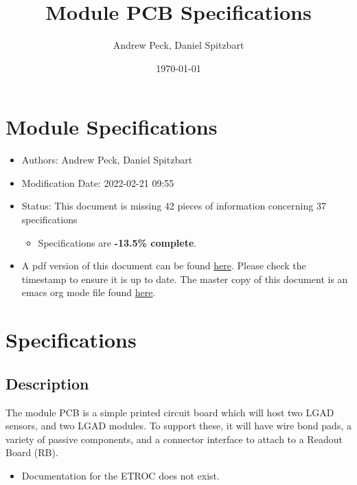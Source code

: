 \documentclass[11pt]{article}
\author{Andrew Peck, Daniel Spitzbart}
\date{\today}
\title{Module PCB Specifications}
\begin{document}
\maketitle
\section{Module Specifications}
\label{sec:org608ffa0}

\begin{itemize}
\item Authors: Andrew Peck, Daniel Spitzbart

\item Modification Date: 2022-02-21 09:55

\item Status: This document is missing 42 pieces of information concerning  37 specifications
\begin{itemize}
\item Specifications are \textbf{-13.5\% complete}.
\end{itemize}

\item A pdf version of this document can be found \href{./module-specs.pdf}{here}. Please check the timestamp to ensure it is up to date. The master copy of this document is an emacs org mode file found \href{https://gitlab.cern.ch/cms-etl-electronics/readout-board-docs/-/blob/master/docs/Specifications/module-specs.org}{here}.
\end{itemize}

\setcounter{tocdepth}{3}
\tableofcontents

\section{Specifications}
\label{sec:org6bcb938}

\subsection{Description}
\label{sec:org631e6b5}

The module PCB is a simple printed circuit board which will host two LGAD sensors, and two LGAD modules. To support these, it will have wire bond pads, a variety of passive components, and a connector interface to attach to a Readout Board (RB).

\begin{itemize}
\item Documentation for the ETROC does not exist.
\end{itemize}
\end{document}
